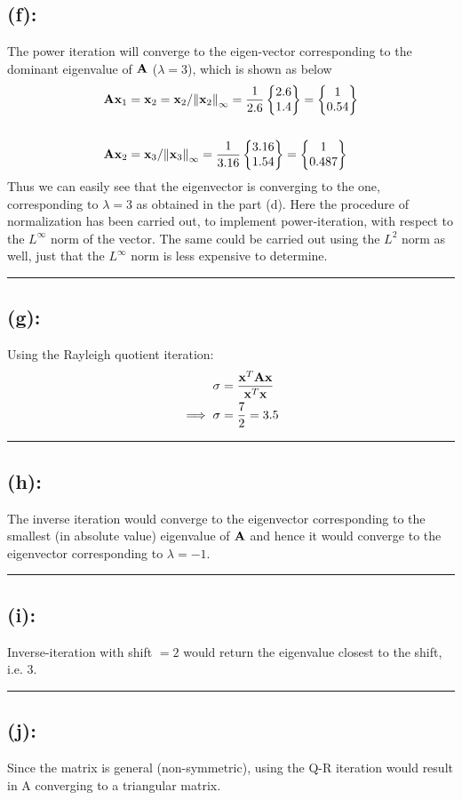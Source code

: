 \subsection*{(f): }
The power iteration will converge to the eigen-vector corresponding to the dominant eigenvalue of $\bf A$ ($\lambda = 3$), which is shown as below
\begin{align*}
& {\bf A}{\bf x}_1
={\bf x}_2 = {\bf x}_2/{{\left\lVert{{\bf x}_2}\right\rVert_\infty}} = \frac{1}{2.6}
\begin{Bmatrix}
2.6 \\ 1.4
\end{Bmatrix}
= \begin{Bmatrix}
1\\0.54
\end{Bmatrix} \\ \\
& {\bf A}{\bf x}_2
={\bf x}_3/{{\left\lVert{{\bf x}_3}\right\rVert_\infty}} = \frac{1}{3.16}
\begin{Bmatrix}
3.16 \\ 1.54
\end{Bmatrix}= \begin{Bmatrix}
1\\0.487
\end{Bmatrix}
\end{align*}
Thus we can easily see that the eigenvector is converging to the one, corresponding to $\lambda = 3$ as obtained in the part (d). Here the procedure of normalization has been carried out, to implement power-iteration, with respect to the $L^\infty$ norm of the vector. The same could be carried out using the $L^2$ norm as well, just that the $L^\infty$ norm is less expensive to determine. \\ \hrule
\subsection*{(g): }
Using the Rayleigh quotient iteration: 
\begin{align*}
\sigma & = \frac{{\bf x}^T {\bf A}{\bf x}}{{\bf x}^T {\bf x}}\\
\implies \sigma & = \frac{7}{2} = 3.5
\end{align*}\hrule
\subsection*{(h): }
The inverse iteration would converge to the eigenvector corresponding to the smallest (in absolute value) eigenvalue of $\bf A$ and hence it would converge to the eigenvector corresponding to $\lambda = -1$. \\ \hrule
\subsection*{(i): }
Inverse-iteration with shift $=2$ would return the eigenvalue closest to the shift, i.e. 3. \\ \hrule
\subsection*{(j): }
Since the matrix is general (non-symmetric), using the Q-R iteration would result in A converging to a triangular matrix. 

